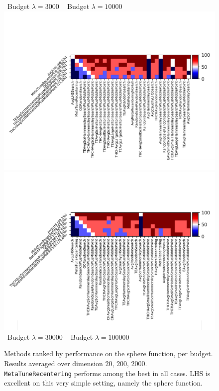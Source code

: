 \begin{figure}[t]
~\hfill Budget $\lambda=3000$ \hfill ~ \hfill Budget $\lambda=10000$ \hfill ~ \\
\includegraphics[trim={10 20 12 80}, clip,width=.48\textwidth]{sections/appendix/ppsn2020-rescaling/figures/fight_namesphere,budget30000.png}
\includegraphics[trim={10 20 12 80}, clip,width=.48\textwidth]{sections/appendix/ppsn2020-rescaling/figures/fight_namesphere,budget100000.png}\\
~\hfill Budget $\lambda=30000$ \hfill ~ \hfill Budget $\lambda=100000$ \hfill ~ \\
\caption{Methods ranked by performance on the sphere function, per budget. Results averaged over dimension $20$, $200$, $2000$. \texttt{MetaTuneRecentering} performs among the best in all cases. {LHS is excellent on this very simple setting, namely the sphere function.} }
    \label{toto}
\end{figure}
%
